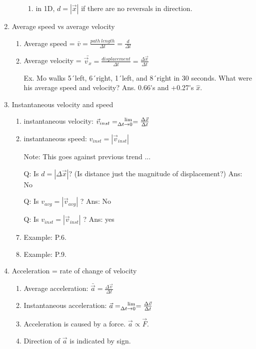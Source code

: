 \documentclass[12pt,epsf]{article}
\begin{document}
\begin{enumerate}
\begin{enumerate}
\begin{enumerate}
	  \item in 1D, $d = \left|\vec{x}\right|$ if there are no reversals in direction.  
	\end{enumerate}
\end{enumerate}
\item Average speed vs average velocity
  \begin{enumerate}
  \item Average speed = $\bar{v} = \frac{path~length}{\Delta t}=
\frac{d}{\Delta t}$
  \item Average velocity = $\bar{\vec{v}_x} = \frac{displacement}{\Delta t}=
\frac{\Delta \vec{x}}{\Delta t}$
  \item [Ex.] Mo walks 5\'\ left, 6\'\ right, 1\'\ left, and 8\'\ right in 30 seconds.  
What were his average speed and velocity? Ans. 0.66\'\/s and +0.27\'\/s $\hat{x}$.
\end{enumerate}
\item Instantaneous velocity and speed
  \begin{enumerate}
  \item instantaneous velocity: $\vec{v}_{inst}=^{\rm ~~~lim}_{\Delta t \rightarrow 0} = \frac{\Delta \vec{x}}{\Delta t}$
  \item instantaneous speed: $v_{inst} = \left| \vec{v}_{inst} \right|$
  \item [Note:] This goes against previous trend ...
  \item [Q:] Is $d=\left| \Delta \vec{x} \right|$? (Is distance just the magnitude of displacement?) Ans: No
  \item [Q:] Is $v_{avg} = \left| \vec{v}_{avg} \right|$ ?  Ans: No
  \item [Q:] Is $v_{inst} = \left| \vec{v}_{inst} \right|$ ?  Ans: yes
  \item Example: P.6.
  \item Example: P.9.
  \end{enumerate}
\item Acceleration = rate of change of velocity
  \begin{enumerate}
  \item Average acceleration:  $\bar{\vec{a}} = \frac{\Delta \vec{v}}{\Delta t}$
  \item Instantaneous acceleration: $\vec{a} = ^{\rm ~~~lim}_{\Delta t \rightarrow 0} = \frac{\Delta \vec{v}}{\Delta t} $
  \item Acceleration is caused by a force. $\vec{a} \propto \vec{F}$.
  \item Direction of $\vec{a}$ is indicated by sign.

\end{enumerate}
\end{enumerate}
\end{document}
